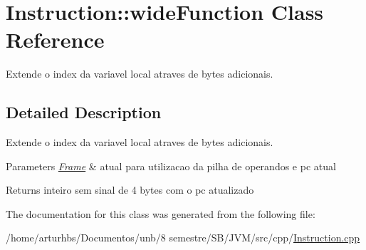 \hypertarget{classInstruction_1_1wideFunction}{}\section{Instruction\+:\+:wide\+Function Class Reference}
\label{classInstruction_1_1wideFunction}


Extende o index da variavel local atraves de bytes adicionais.  




\subsection{Detailed Description}
Extende o index da variavel local atraves de bytes adicionais. 


\begin{DoxyParams}{Parameters}
{\em \hyperlink{classFrame}{Frame}} & atual para utilizacao da pilha de operandos e pc atual \\
\hline
\end{DoxyParams}
\begin{DoxyReturn}{Returns}
inteiro sem sinal de 4 bytes com o pc atualizado 
\end{DoxyReturn}


The documentation for this class was generated from the following file\+:\begin{DoxyCompactItemize}
\item 
/home/arturhbs/\+Documentos/unb/8 semestre/\+S\+B/\+J\+V\+M/src/cpp/\hyperlink{Instruction_8cpp}{Instruction.\+cpp}\end{DoxyCompactItemize}
